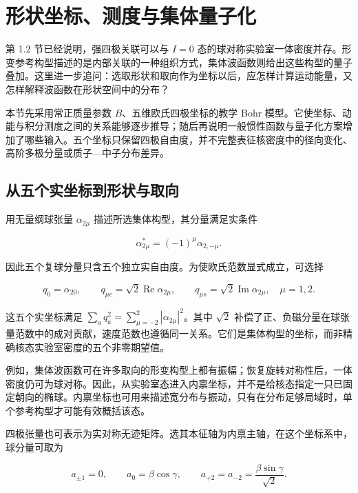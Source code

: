 \section{形状坐标、测度与集体量子化}\label{sec:2-4}


第 1.2 节已经说明，强四极关联可以与 $I=0$ 态的球对称实验室一体密度并存。形变参考构型描述的是内部关联的一种组织方式，集体波函数则给出这些构型的量子叠加。这里进一步追问：选取形状和取向作为坐标以后，应怎样计算运动能量，又怎样解释波函数在形状空间中的分布？

本节先采用常正质量参数 $B$、五维欧氏四极坐标的教学 Bohr 模型。它使坐标、动能与积分测度之间的关系能够逐步推导；随后再说明一般惯性函数与量子化方案增加了哪些输入。五个坐标只保留四极自由度，并不完整表征核密度中的径向变化、高阶多极分量或质子—中子分布差异。


\subsection{从五个实坐标到形状与取向}\label{sec:2-4-1}


用无量纲球张量 $\alpha_{2\mu}$ 描述所选集体构型，其分量满足实条件

\begin{equation}\label{eq:2-4-1}
\alpha_{2\mu}^{*}=(-1)^\mu\alpha_{2,-\mu}.
\end{equation}

因此五个复球分量只含五个独立实自由度。为使欧氏范数显式成立，可选择

\begin{equation}\label{eq:2-4-2}
q_0=\alpha_{20},\qquad
q_{\mu c}=\sqrt{2}\operatorname{Re}\alpha_{2\mu},\qquad
q_{\mu s}=\sqrt{2}\operatorname{Im}\alpha_{2\mu},
\quad \mu=1,2.
\end{equation}

这五个实坐标满足 $\sum_a q_a^2=\sum_{\mu=-2}^{2}|\alpha_{2\mu}|^2$。其中 $\sqrt{2}$ 补偿了正、负磁分量在球张量范数中的成对贡献，速度范数也遵循同一关系。它们是集体构型的坐标，而非精确核态实验室密度的五个非零期望值。

例如，集体波函数可在许多取向的形变构型上都有振幅；恢复旋转对称性后，一体密度仍可为球对称。因此，从实验室态进入内禀坐标，并不是给核态指定一只已固定朝向的椭球。内禀坐标也可用来描述宽分布与振动，只有在分布足够局域时，单个参考构型才可能有效概括该态。

四极张量也可表示为实对称无迹矩阵。选其本征轴为内禀主轴，在这个坐标系中，球分量可取为

\begin{equation}\label{eq:2-4-3}
a_{\pm1}=0,\qquad
a_0=\beta\cos\gamma,\qquad
a_{+2}=a_{-2}=\frac{\beta\sin\gamma}{\sqrt{2}}.
\end{equation}


